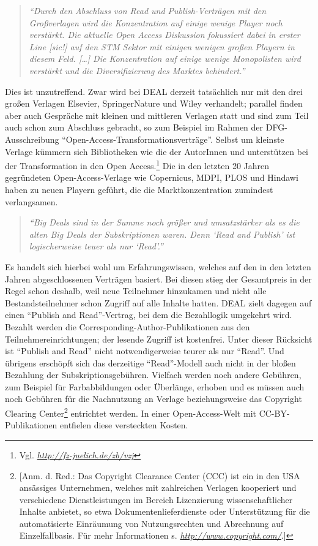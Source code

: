 \documentclass[a4paper,
fontsize=11pt,
oneside,
numbers=noperiodatend,
parskip=half-,
bibliography=totoc,
final
]{scrartcl}
\begin{document}
\begin{quote}
\emph{\enquote{Durch den Abschluss von Read und Publish-Verträgen mit
den Großverlagen wird die Konzentration auf einige wenige Player noch
verstärkt. Die aktuelle Open Access Diskussion fokussiert dabei in
erster Line {[}sic!{]} auf den STM Sektor mit einigen wenigen großen
Playern in diesem Feld. {[}\ldots{}{]} Die Konzentration auf einige
wenige Monopolisten wird verstärkt und die Diversifizierung des Marktes
behindert.}}
\end{quote}

Dies ist unzutreffend. Zwar wird bei DEAL derzeit tatsächlich nur mit
den drei großen Verlagen Elsevier, SpringerNature und Wiley verhandelt;
parallel finden aber auch Gespräche mit kleinen und mittleren Verlagen
statt und sind zum Teil auch schon zum Abschluss gebracht, so zum
Beispiel im Rahmen der DFG-Ausschreibung
\enquote{Open-Access-Transformationsverträge}. Selbst um kleinste
Verlage kümmern sich Bibliotheken wie die der AutorInnen und
unterstützen bei der Transformation in den Open Access.\footnote{Vgl.
  \href{http://fz-juelich.de/zb/vzj}{\emph{http://fz-juelich.de/zb/vzj}}}
Die in den letzten 20 Jahren gegründeten Open-Access-Verlage wie
Copernicus, MDPI, PLOS und Hindawi haben zu neuen Playern geführt, die
die Marktkonzentration zumindest verlangsamen.

\begin{quote}
\emph{\enquote{Big Deals sind in der Summe noch größer und umsatzstärker
als es die alten Big Deals der Subskriptionen waren. Denn \enquote{Read
and Publish} ist logischerweise teuer als nur \enquote{Read}.}}
\end{quote}

Es handelt sich hierbei wohl um Erfahrungswissen, welches auf den in den
letzten Jahren abgeschlossenen Verträgen basiert. Bei diesen stieg der
Gesamtpreis in der Regel schon deshalb, weil neue Teilnehmer hinzukamen
und nicht alle Bestandsteilnehmer schon Zugriff auf alle Inhalte hatten.
DEAL zielt dagegen auf einen \enquote{Publish and Read}-Vertrag, bei dem
die Bezahllogik umgekehrt wird. Bezahlt werden die
Corresponding-Author-Publikationen aus den Teilnehmereinrichtungen; der
lesende Zugriff ist kostenfrei. Unter dieser Rücksicht ist
\enquote{Publish and Read} nicht notwendigerweise teurer als nur
\enquote{Read}. Und übrigens erschöpft sich das derzeitige
\enquote{Read}-Modell auch nicht in der bloßen Bezahlung der
Subskriptionsgebühren. Vielfach werden noch andere Gebühren, zum
Beispiel für Farbabbildungen oder Überlänge, erhoben und es müssen auch
noch Gebühren für die Nachnutzung an Verlage beziehungsweise das
Copyright Clearing Center\footnote{{[}Anm. d. Red.: Das Copyright
  Clearance Center (CCC) ist ein in den USA ansässiges Unternehmen,
  welches mit zahlreichen Verlagen kooperiert und verschiedene
  Dienstleistungen im Bereich Lizenzierung wissenschaftlicher Inhalte
  anbietet, so etwa Dokumentenlieferdienste oder Unterstützung für die
  automatisierte Einräumung von Nutzungsrechten und Abrechnung auf
  Einzelfallbasis. Für mehr Informationen s.
  \href{http://www.copyright.com/}{\emph{http://www.copyright.com/}}.{]}}
entrichtet werden. In einer Open-Access-Welt mit CC-BY-Publikationen
entfielen diese versteckten Kosten.
\end{document}
